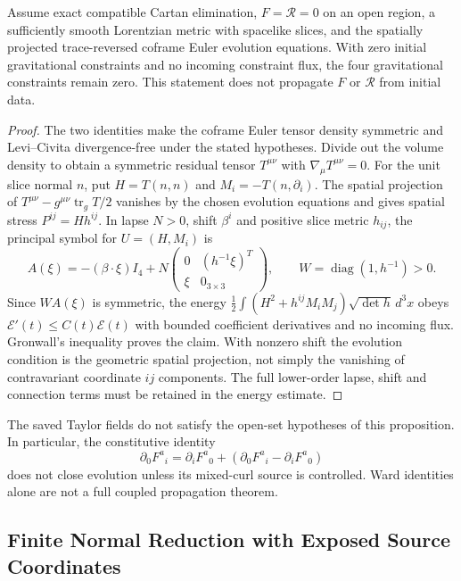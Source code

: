 \begin{proposition}
\label{v490:subsidiary}
Assume exact compatible Cartan elimination, $F=\mathcal R=0$ on an open
region, a sufficiently smooth Lorentzian metric with spacelike slices,
and the spatially projected trace-reversed coframe Euler evolution
equations. With zero initial gravitational constraints and no incoming
constraint flux, the four gravitational constraints remain zero.
This statement does not propagate $F$ or $\mathcal R$ from initial data.
\end{proposition}
\begin{proof}
The two identities make the coframe Euler tensor density symmetric and
Levi--Civita divergence-free under the stated hypotheses. Divide out the
volume density to obtain a symmetric residual tensor $T^{\mu\nu}$ with
$\nabla_\mu T^{\mu\nu}=0$. For the unit slice normal $n$, put
$H=T(n,n)$ and $M_i=-T(n,\partial_i)$. The spatial projection of
$T^{\mu\nu}-g^{\mu\nu}\operatorname{tr}_g T/2$ vanishes by the chosen
evolution equations and gives spatial stress $P^{ij}=Hh^{ij}$.
In lapse $N>0$, shift $\beta^i$ and positive slice metric $h_{ij}$, the
principal symbol for $U=(H,M_i)$ is
\[
 A(\xi)=-(\beta\cdot\xi)I_4+
 N\begin{pmatrix}0&(h^{-1}\xi)^T\\\xi&0_{3\times3}\end{pmatrix},
 \qquad W=\operatorname{diag}(1,h^{-1})>0.
\]
Since $WA(\xi)$ is symmetric, the energy
$\tfrac12\int(H^2+h^{ij}M_iM_j)\sqrt{\det h}\,d^3x$ obeys
$\mathcal E'(t)\leq C(t)\mathcal E(t)$ with bounded coefficient
derivatives and no incoming flux. Gronwall's inequality proves the claim.
With nonzero shift the evolution condition is the geometric spatial
projection, not simply the vanishing of contravariant coordinate $ij$
components. The full lower-order lapse, shift and connection terms must
be retained in the energy estimate.
\end{proof}

The saved Taylor fields do not satisfy the open-set hypotheses of this
proposition. In particular, the constitutive identity
\[
 \partial_0F^a{}_{i}=\partial_iF^a{}_{0}
              +(\partial_0F^a{}_{i}-\partial_iF^a{}_{0})
\]
does not close evolution unless its mixed-curl source is controlled.
Ward identities alone are not a full coupled propagation theorem.

\subsection{Finite Normal Reduction with Exposed Source Coordinates}
\label{v490:normal-reduction}

